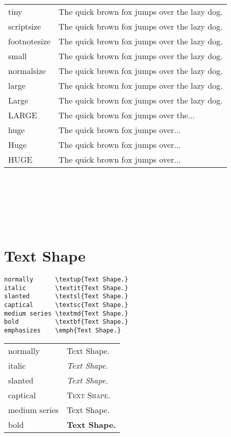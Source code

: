 \documentclass[a4paper,12pt]{article}
\begin{document}
\begin{tabular}{l|l}
	tiny         & {\tiny The quick brown fox jumps over the lazy dog.}         \\
	scriptsize   & {\scriptsize The quick brown fox jumps over the lazy dog.}   \\
	footnotesize & {\footnotesize The quick brown fox jumps over the lazy dog.} \\
	small        & {\small The quick brown fox jumps over the lazy dog.}        \\
	normalsize   & {\normalsize The quick brown fox jumps over the lazy dog.}   \\
	large        & {\large The quick brown fox jumps over the lazy dog.}        \\
	Large        & {\Large The quick brown fox jumps over the lazy dog.}        \\
	LARGE        & {\LARGE The quick brown fox jumps over the...}               \\
	huge         & {\huge The quick brown fox jumps over...}                    \\
	Huge         & {\huge The quick brown fox jumps over...}                    \\
	HUGE         & {\huge The quick brown fox jumps over...}                    \\
\end{tabular} \\ \\ \\ \\ \\


\section*{Text Shape}

\begin{verbatim}
normally      \textup{Text Shape.}
italic        \textit{Text Shape.}
slanted       \textsl{Text Shape.}
captical      \textsc{Text Shape.}
medium series \textmd{Text Shape.}
bold          \textbf{Text Shape.}
emphasizes    \emph{Text Shape.}
\end{verbatim}

\begin{tabular}{l|l}
	normally      & \textup{Text Shape.} \\
	italic        & \textit{Text Shape.} \\
	slanted       & \textsl{Text Shape.} \\
	captical      & \textsc{Text Shape.} \\
	medium series & \textmd{Text Shape.} \\
	bold          & \textbf{Text Shape.} \\
\end{tabular} \\
\end{document}
